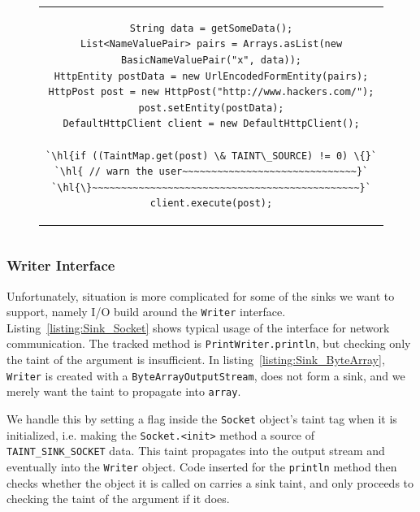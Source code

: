 \documentclass[12pt,twoside,notitlepage]{report}
\begin{document}
\begin{figure}[h]
	\centering
	\begin{tabular}{c}
	\begin{lstlisting}
String data = getSomeData();
List<NameValuePair> pairs = Arrays.asList(new BasicNameValuePair("x", data));
HttpEntity postData = new UrlEncodedFormEntity(pairs);
HttpPost post = new HttpPost("http://www.hackers.com/");
post.setEntity(postData);
DefaultHttpClient client = new DefaultHttpClient();

`\hl{if ((TaintMap.get(post) \& TAINT\_SOURCE) != 0) \{}`
`\hl{ // warn the user~~~~~~~~~~~~~~~~~~~~~~~~~~~~~~}`
`\hl{\}~~~~~~~~~~~~~~~~~~~~~~~~~~~~~~~~~~~~~~~~~~~~~~}`
client.execute(post);
	\end{lstlisting}
	\end{tabular}
	\begin{lstlisting}[caption={HTTP request using the Apache client, with sink instrumentation},
	                   label={listing:Sink_ApacheHTTPClient}]
	\end{lstlisting}
\end{figure}

\subsubsection{Writer Interface}

Unfortunately, situation is more complicated for some of the sinks we want to support, namely I/O build around the \verb$Writer$ interface. Listing~\ref{listing:Sink_Socket} shows typical usage of the interface for network communication. The tracked method is \verb$PrintWriter.println$, but checking only the taint of the argument is insufficient. In listing~\ref{listing:Sink_ByteArray}, \verb$Writer$ is created with a \verb$ByteArrayOutputStream$, does not form a sink, and we merely want the taint to propagate into \verb$array$. 

We handle this by setting a flag inside the \verb$Socket$ object's taint tag when it is initialized, i.e. making the \verb$Socket.<init>$ method a source of \verb$TAINT_SINK_SOCKET$ data. This taint propagates into the output stream and eventually into the \verb$Writer$ object. Code inserted for the \verb$println$ method then checks whether the object it is called on carries a sink taint, and only proceeds to checking the taint of the argument if it does.
\end{document}
